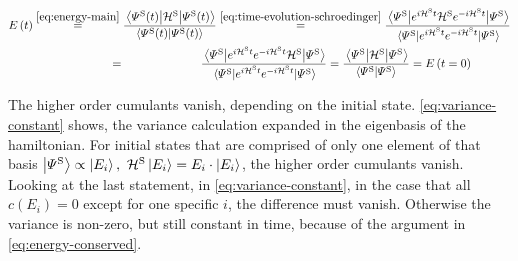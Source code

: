 \begin{equation}
    \label{eq:energy-conserved}
    \begin{split}
        \energyOft &\stackrel{\ref{eq:energy-main}}{=}
        \frac{\bracketHelper{\psiOfT[\schroedingerPicture]}{\pictureHamiltonian[\schroedingerPicture]}{\psiOfT[\schroedingerPicture]}}{\braketHelper{\psiOfT[\schroedingerPicture]}{\psiOfT[\schroedingerPicture]}}
        \stackrel{\ref{eq:time-evolution-schroedinger}}{=}
        \frac{\bracketHelper{\picturePsi[\schroedingerPicture]{}}{e^{i \pictureHamiltonian[\schroedingerPicture] t}{\pictureHamiltonian[\schroedingerPicture]}e^{-i \pictureHamiltonian[\schroedingerPicture] t}}{\picturePsi[\schroedingerPicture]{}}}{\bracketHelper{\picturePsi[\schroedingerPicture]{}}{e^{i \pictureHamiltonian[\schroedingerPicture] t}e^{-i \pictureHamiltonian[\schroedingerPicture] t}}{\picturePsi[\schroedingerPicture]{}}}\\
        &\stackrel{\phantom{\ref{eq:time-evolution-schroedinger}}}{=}
        \frac{\bracketHelper{\picturePsi[\schroedingerPicture]{}}{e^{i \pictureHamiltonian[\schroedingerPicture] t}e^{-i \pictureHamiltonian[\schroedingerPicture] t}{\pictureHamiltonian[\schroedingerPicture]}}{\picturePsi[\schroedingerPicture]{}}}{\bracketHelper{\picturePsi[\schroedingerPicture]{}}{e^{i \pictureHamiltonian[\schroedingerPicture] t}e^{-i \pictureHamiltonian[\schroedingerPicture] t}}{\picturePsi[\schroedingerPicture]{}}} = 
        \frac{\bracketHelper{\picturePsi[\schroedingerPicture]{}}{\pictureHamiltonian[\schroedingerPicture]}{\picturePsi[\schroedingerPicture]{}}}{\braketHelper{\picturePsi[\schroedingerPicture]{}}{\picturePsi[\schroedingerPicture]{}}}
         = \energyOft[t=0]
    \end{split}
\end{equation}

The higher order cumulants vanish, depending on the initial state. 
\autoref{eq:variance-constant} shows, the variance calculation expanded in the eigenbasis of the hamiltonian.
For initial states that are comprised of only one element of that basis $\ketN[{\picturePsi[\schroedingerPicture]{}}] \propto \ketN[E_i],\,\,\pictureHamiltonian[\schroedingerPicture]\ketN[E_i] = E_i\cdot\ketN[E_i]$, the higher order cumulants vanish. 
Looking at the last statement, in \autoref{eq:variance-constant}, in the case that all $c(E_i) = 0$ except for one specific $i$, the difference must vanish.
Otherwise the variance is non-zero, but still constant in time, because of the argument in \autoref{eq:energy-conserved}.

